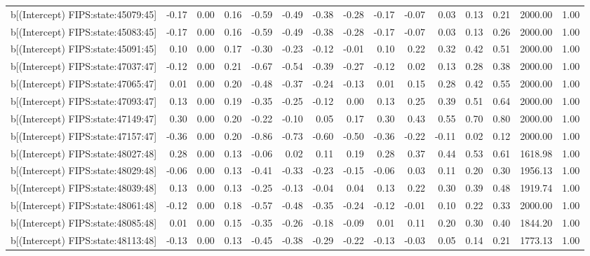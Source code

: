 \begin{table}[ht]
\begin{tabular}{rrrrrrrrrrrrrrr}
  b[(Intercept) FIPS:state:45079:45] & -0.17 & 0.00 & 0.16 & -0.59 & -0.49 & -0.38 & -0.28 & -0.17 & -0.07 & 0.03 & 0.13 & 0.21 & 2000.00 & 1.00 \\ 
  b[(Intercept) FIPS:state:45083:45] & -0.17 & 0.00 & 0.16 & -0.59 & -0.49 & -0.38 & -0.28 & -0.17 & -0.07 & 0.03 & 0.13 & 0.26 & 2000.00 & 1.00 \\ 
  b[(Intercept) FIPS:state:45091:45] & 0.10 & 0.00 & 0.17 & -0.30 & -0.23 & -0.12 & -0.01 & 0.10 & 0.22 & 0.32 & 0.42 & 0.51 & 2000.00 & 1.00 \\ 
  b[(Intercept) FIPS:state:47037:47] & -0.12 & 0.00 & 0.21 & -0.67 & -0.54 & -0.39 & -0.27 & -0.12 & 0.02 & 0.13 & 0.28 & 0.38 & 2000.00 & 1.00 \\ 
  b[(Intercept) FIPS:state:47065:47] & 0.01 & 0.00 & 0.20 & -0.48 & -0.37 & -0.24 & -0.13 & 0.01 & 0.15 & 0.28 & 0.42 & 0.55 & 2000.00 & 1.00 \\ 
  b[(Intercept) FIPS:state:47093:47] & 0.13 & 0.00 & 0.19 & -0.35 & -0.25 & -0.12 & 0.00 & 0.13 & 0.25 & 0.39 & 0.51 & 0.64 & 2000.00 & 1.00 \\ 
  b[(Intercept) FIPS:state:47149:47] & 0.30 & 0.00 & 0.20 & -0.22 & -0.10 & 0.05 & 0.17 & 0.30 & 0.43 & 0.55 & 0.70 & 0.80 & 2000.00 & 1.00 \\ 
  b[(Intercept) FIPS:state:47157:47] & -0.36 & 0.00 & 0.20 & -0.86 & -0.73 & -0.60 & -0.50 & -0.36 & -0.22 & -0.11 & 0.02 & 0.12 & 2000.00 & 1.00 \\ 
  b[(Intercept) FIPS:state:48027:48] & 0.28 & 0.00 & 0.13 & -0.06 & 0.02 & 0.11 & 0.19 & 0.28 & 0.37 & 0.44 & 0.53 & 0.61 & 1618.98 & 1.00 \\ 
  b[(Intercept) FIPS:state:48029:48] & -0.06 & 0.00 & 0.13 & -0.41 & -0.33 & -0.23 & -0.15 & -0.06 & 0.03 & 0.11 & 0.20 & 0.30 & 1956.13 & 1.00 \\ 
  b[(Intercept) FIPS:state:48039:48] & 0.13 & 0.00 & 0.13 & -0.25 & -0.13 & -0.04 & 0.04 & 0.13 & 0.22 & 0.30 & 0.39 & 0.48 & 1919.74 & 1.00 \\ 
  b[(Intercept) FIPS:state:48061:48] & -0.12 & 0.00 & 0.18 & -0.57 & -0.48 & -0.35 & -0.24 & -0.12 & -0.01 & 0.10 & 0.22 & 0.33 & 2000.00 & 1.00 \\ 
  b[(Intercept) FIPS:state:48085:48] & 0.01 & 0.00 & 0.15 & -0.35 & -0.26 & -0.18 & -0.09 & 0.01 & 0.11 & 0.20 & 0.30 & 0.40 & 1844.20 & 1.00 \\ 
  b[(Intercept) FIPS:state:48113:48] & -0.13 & 0.00 & 0.13 & -0.45 & -0.38 & -0.29 & -0.22 & -0.13 & -0.03 & 0.05 & 0.14 & 0.21 & 1773.13 & 1.00 \\ 

\end{tabular}
\end{table}
